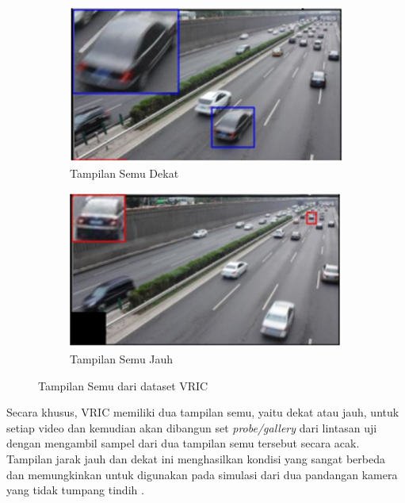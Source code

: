 \begin{figure}[h!]
  \centering
  \begin{subfigure}{.5\textwidth}
    \centering
    \includegraphics[width=.8\linewidth]{gambar/tampilansemudekat.png}
    \caption{Tampilan Semu Dekat}
    \label{fig:tampilansemudekat}
  \end{subfigure}%
  \begin{subfigure}{.5\textwidth}
    \centering
    \includegraphics[width=.8\linewidth]{gambar/tampilansemujauh.png}
    \caption{Tampilan Semu Jauh}
    \label{tampilansemujauh}
  \end{subfigure}
  \caption{Tampilan Semu dari dataset VRIC}
  \label{fig:tampilansemudaridatasetvric}
\end{figure}

Secara khusus, VRIC memiliki dua tampilan semu, yaitu dekat atau jauh, untuk setiap video dan kemudian akan dibangun set \emph{probe/gallery} dari lintasan uji dengan mengambil sampel 
dari dua tampilan semu tersebut secara acak. Tampilan jarak jauh dan dekat ini menghasilkan kondisi yang sangat berbeda dan memungkinkan untuk digunakan pada simulasi dari dua pandangan 
kamera yang tidak tumpang tindih \parencite{Kanaci2018}.



